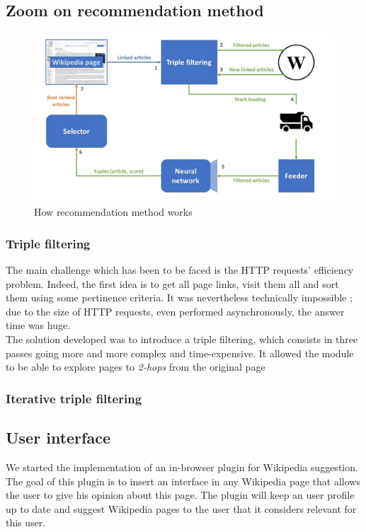 \documentclass[11pt]{article}
\theoremstyle{plain}
\theoremstyle{definition}
\theoremstyle{remark}
\begin{document}
\subsection{Zoom on recommendation method}

\begin{figure}[h!]
	\centering
    \includegraphics[width=400pt]{diagram_zoom.png}
    \caption{How recommendation method works}
    \label{arch_glo}
\end{figure}

\subsubsection{Triple filtering}

The main challenge which has been to be faced is the HTTP requests' efficiency problem. Indeed, the first idea is to get all page links, visit them all and sort them using some pertinence criteria. It was nevertheless technically impossible ; due to the size of HTTP requests, even performed asynchronously, the answer time was huge. \\

The solution developed was to introduce a triple filtering, which consists in three passes going more and more complex and time-expensive. It allowed the module to be able to explore pages to \textit{2-hops} from the original page

\subsubsection{Iterative triple filtering}

\subsection{User interface}
We started the implementation of an in-browser plugin for Wikipedia suggestion.
The goal of this plugin is to insert an interface in any Wikipedia page that allows the user to give his opinion about this page. The plugin will keep an user profile up to date and suggest Wikipedia pages to the user that it considers relevant for this user.
\end{document}
